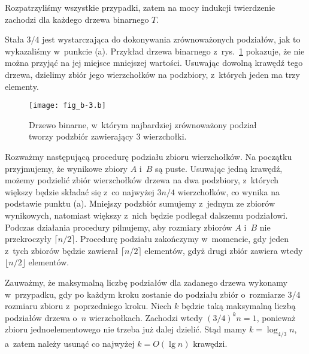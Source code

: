 Rozpatrzyliśmy wszystkie przypadki, zatem na mocy indukcji twierdzenie zachodzi dla każdego drzewa binarnego $T$.

\subproblem %
Stała $3/4$ jest wystarczająca do dokonywania zrównoważonych podziałów, jak to wykazaliśmy w~punkcie (a).
Przykład drzewa binarnego z~rys.\ \ref{fig:B-3b} pokazuje, że nie można przyjąć na jej miejsce mniejszej wartości.
Usuwając dowolną krawędź tego drzewa, dzielimy zbiór jego wierzchołków na podzbiory, z~których jeden ma trzy elementy.
\begin{figure}[ht]
	\begin{center}
		\texttt{[image: fig\_b-3.b]}
	\end{center}
	\caption{Drzewo binarne, w~którym najbardziej zrównoważony podział tworzy podzbiór zawierający 3 wierzchołki.} \label{fig:B-3b}
\end{figure}

\subproblem %
Rozważmy następującą procedurę podziału zbioru wierzchołków.
Na początku przyjmujemy, że wynikowe zbiory $A$ i~$B$ są puste.
Usuwając jedną krawędź, możemy podzielić  zbiór wierzchołków drzewa na dwa podzbiory, z~których większy będzie składać się z~co najwyżej $3n/4$ wierzchołków, co wynika na podstawie punktu (a).
Mniejszy podzbiór sumujemy z~jednym ze zbiorów wynikowych, natomiast większy z~nich będzie podlegał dalszemu podziałowi.
Podczas działania procedury pilnujemy, aby rozmiary zbiorów $A$ i~$B$ nie przekroczyły $\lceil n/2\rceil$.
Procedurę podziału zakończymy w~momencie, gdy jeden z~tych zbiorów będzie zawierał $\lceil n/2\rceil$ elementów, gdyż drugi zbiór zawiera wtedy $\lfloor n/2\rfloor$ elementów.

Zauważmy, że maksymalną liczbę podziałów dla zadanego drzewa wykonamy w~przypadku, gdy po każdym kroku zostanie do podziału zbiór o~rozmiarze $3/4$ rozmiaru zbioru z~poprzedniego kroku.
Niech $k$ będzie taką maksymalną liczbą podziałów drzewa o~$n$ wierzchołkach.
Zachodzi wtedy $(3/4)^kn=1$, ponieważ zbioru jednoelementowego nie trzeba już dalej dzielić.
Stąd mamy $k=\log_{4/3}n$, a~zatem należy usunąć co najwyżej $k=O(\lg n)$ krawędzi.
